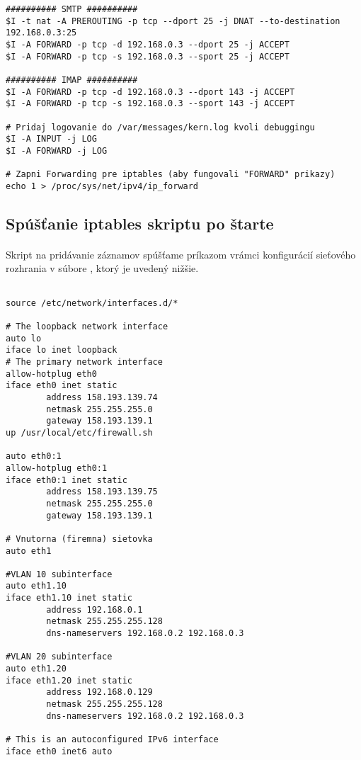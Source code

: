 {\begin{small}
\begin{verbatim}
########## SMTP ##########
$I -t nat -A PREROUTING -p tcp --dport 25 -j DNAT --to-destination 192.168.0.3:25
$I -A FORWARD -p tcp -d 192.168.0.3 --dport 25 -j ACCEPT
$I -A FORWARD -p tcp -s 192.168.0.3 --sport 25 -j ACCEPT

########## IMAP ##########
$I -A FORWARD -p tcp -d 192.168.0.3 --dport 143 -j ACCEPT
$I -A FORWARD -p tcp -s 192.168.0.3 --sport 143 -j ACCEPT

# Pridaj logovanie do /var/messages/kern.log kvoli debuggingu
$I -A INPUT -j LOG
$I -A FORWARD -j LOG

# Zapni Forwarding pre iptables (aby fungovali "FORWARD" prikazy)
echo 1 > /proc/sys/net/ipv4/ip_forward

\end{verbatim}

\end{small}

}

\subsection{Spúšťanie iptables skriptu po štarte}
\paragraph{}
Skript na pridávanie záznamov  spúšťame príkazom  vrámci konfigurácií sieťového rozhrania  v súbore , ktorý je uvedený nižšie.

\noindent
{\selectfont

\begin{small}

\begin{verbatim}

source /etc/network/interfaces.d/*

# The loopback network interface
auto lo
iface lo inet loopback
# The primary network interface
allow-hotplug eth0
iface eth0 inet static
        address 158.193.139.74
        netmask 255.255.255.0
        gateway 158.193.139.1
up /usr/local/etc/firewall.sh

auto eth0:1
allow-hotplug eth0:1
iface eth0:1 inet static
        address 158.193.139.75
        netmask 255.255.255.0
        gateway 158.193.139.1

# Vnutorna (firemna) sietovka
auto eth1

#VLAN 10 subinterface
auto eth1.10
iface eth1.10 inet static
        address 192.168.0.1
        netmask 255.255.255.128
        dns-nameservers 192.168.0.2 192.168.0.3

#VLAN 20 subinterface
auto eth1.20
iface eth1.20 inet static
        address 192.168.0.129
        netmask 255.255.255.128
        dns-nameservers 192.168.0.2 192.168.0.3

# This is an autoconfigured IPv6 interface
iface eth0 inet6 auto

\end{verbatim}

\end{small}

}